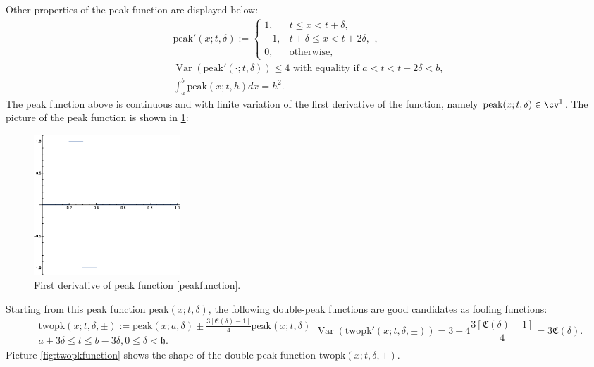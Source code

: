 \documentclass{iitthesis}
\DeclareMathOperator{\Var}{Var}
\theoremstyle{definition}
\theoremstyle{remark}
\begin{document}
Other properties of the peak function are displayed below:
\begin{gather*}
  \text{peak}'(x;t,\delta):= \begin{cases} \displaystyle 1, & t \le x < t+\delta,\\[1ex]
\displaystyle -1, & t+\delta \le x < t+2\delta,\\[1ex]
\displaystyle  0, & \text{otherwise},
\end{cases}, \\
\Var(\text{peak}'(\cdot;t,\delta))\le 4 \text{ with equality if } a<t<t+2\delta<b, \\
\int_{a}^{b}\text{peak}(x;t,h)dx=h^2.
\end{gather*}
The peak function above is continuous and with finite variation of the first derivative of the function, namely $\text{peak}(x;t,\delta)\in\cv^1$. The picture of the peak function is shown in \ref{fig:peakp1}:
\begin{figure}[h]
\centering
\includegraphics[width=5.5cm]{peakp1.eps}
\caption{First derivative of peak function \ref{peakfunction}. \label{fig:peakp1}}
\end{figure}
Starting from this peak function $\text{peak}(x;t,\delta)$, the following double-peak functions are good candidates as fooling functions:
\begin{subequations}
    \begin{multline}\label{foolingfunctiontrap}
        \text{twopk}(x;t,\delta,\pm):=\text{peak}(x;a,\mathfrak{\delta})\pm\frac{3[\mathfrak{C}(\delta)-1]}{4}\text{peak}(x;t,\delta)\\ a+3\mathfrak{\delta}\le t \le b-3\delta, 0\le \delta <\mathfrak{h}.
    \end{multline}
    \begin{equation}
        \Var(\text{twopk}'(x;t,\delta,\pm))=3+4\frac{3[\mathfrak{C}(\delta)-1]}{4}=3\mathfrak{C}(\delta).
    \end{equation}
\end{subequations}
Picture \ref{fig:twopkfunction} shows the shape of the double-peak function $\text{twopk}(x;t,\delta,+)$.
\end{document}
